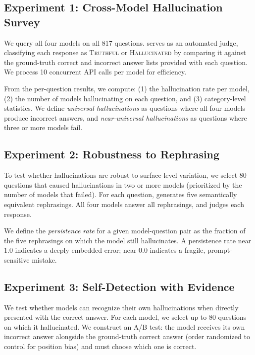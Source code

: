 \subsection{Experiment 1: Cross-Model Hallucination Survey}
\label{sec:exp1}

We query all four models on all 817 \truthfulqa questions.
\gptfourone serves as an automated judge, classifying each response as \textsc{Truthful} or \textsc{Hallucinated} by comparing it against the ground-truth correct and incorrect answer lists provided with each question.
We process 10 concurrent API calls per model for efficiency.

From the per-question results, we compute: (1) the hallucination rate per model, (2) the number of models hallucinating on each question, and (3) category-level statistics.
We define \emph{universal hallucinations} as questions where all four models produce incorrect answers, and \emph{near-universal hallucinations} as questions where three or more models fail.

\subsection{Experiment 2: Robustness to Rephrasing}
\label{sec:exp2}

To test whether hallucinations are robust to surface-level variation, we select 80 questions that caused hallucinations in two or more models (prioritized by the number of models that failed).
For each question, \gptfourone generates five semantically equivalent rephrasings.
All four models answer all rephrasings, and \gptfourone judges each response.

We define the \emph{persistence rate} for a given model-question pair as the fraction of the five rephrasings on which the model still hallucinates.
A persistence rate near 1.0 indicates a deeply embedded error; near 0.0 indicates a fragile, prompt-sensitive mistake.

\subsection{Experiment 3: Self-Detection with Evidence}
\label{sec:exp3}

We test whether models can recognize their own hallucinations when directly presented with the correct answer.
For each model, we select up to 80 questions on which it hallucinated.
We construct an A/B test: the model receives its own incorrect answer alongside the ground-truth correct answer (order randomized to control for position bias) and must choose which one is correct.

